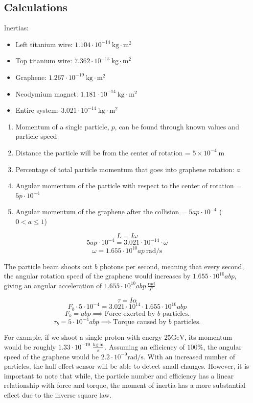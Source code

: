 \documentclass{article}
\begin{document}
    \subsection{Calculations}

    \indent Inertias:
    \begin{itemize}
    \item Left titanium wire: $1.104\cdot10^{-14}\:\text{kg}\cdot\text{m}^2$
    \item Top titanium wire: $7.362\cdot10^{-15}\:\text{kg}\cdot\text{m}^2$
    \item Graphene: $1.267\cdot10^{-19}\:\text{kg}\cdot\text{m}^2$
    \item Neodymium magnet: $1.181\cdot10^{-14}\:\text{kg}\cdot\text{m}^2$
    \item Entire system: $3.021\cdot10^{-14}\:\text{kg}\cdot\text{m}^2$
    \end{itemize}

    \begin{enumerate}
    \item Momentum of a single particle, $p$, can be found through known values and particle speed
    \item Distance the particle will be from the center of rotation = $5\times10^{-4} \:\text{m}$
    \item Percentage of total particle momentum that goes into graphene rotation: $a$
    \item Angular momentum of the particle with respect to the center of rotation = $5p\cdot10^{-4}$
    \item Angular momentum of the graphene after the collision = $5ap\cdot10^{-4}$ ($0 < a \le 1$)
    \end{enumerate}

    $$L = I\omega$$
    $$5ap\cdot10^{-4}=3.021\cdot10^{-14}\cdot\omega$$
    $$\omega = 1.655\cdot10^{10}ap\: \text{rad/s}$$

    The particle beam shoots out $b$ photons per second, meaning that every second, the angular rotation speed of the graphene would increases by $1.655\cdot10^{10} abp$, giving an angular acceleration of $1.655\cdot10^{10}abp\: \frac{\text{rad}}{\text{s}^2}$

    $$\tau=I\alpha$$
    $$F_b\cdot5\cdot10^{-4}=3.021\cdot10^{14}\cdot1.655\cdot10^{10}abp$$
    $$F_b=abp\implies\text{Force exerted by }b\text{ particles.}$$
    $$\tau_b=5\cdot10^{-4}abp\implies\text{Torque caused by }b\text{ particles.}$$

For example, if we shoot a single proton with energy $25\text{GeV}$, its momentum would be roughly $1.33\cdot10^{-19}\:\frac{\text{kg}\cdot\text{m}}{\text{s}}$. Assuming an efficiency of $100\%$, the angular speed of the graphene would be $2.2\cdot10^{-9} \text{rad/s}$. With an increased number of particles, the hall effect sensor will be able to detect small changes. However, it is important to note that while, the particle number and efficiency has a linear relationship with force and torque, the moment of inertia has a more substantial effect due to the inverse square law.
\end{document}

